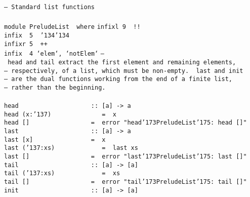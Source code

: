 \noindent\bprogB
\mbox{\tt --\ Standard\ list\ functions}\\
\mbox{\tt }\\[-8pt]
\mbox{\tt module\ PreludeList\ \ where}
%
\eprogB\noindent\bprogB
\mbox{\tt infixl\ 9\ \ !!}\\
\mbox{\tt infix\ \ 5\ \ {\char'134}{\char'134}}\\
\mbox{\tt infixr\ 5\ \ ++}\\
\mbox{\tt infix\ \ 4\ `elem`,\ `notElem`}
%
%
%
%
%
\eprogB\noindent\bprogB
\mbox{\tt --\ head\ and\ tail\ extract\ the\ first\ element\ and\ remaining\ elements,}\\
\mbox{\tt --\ respectively,\ of\ a\ list,\ which\ must\ be\ non-empty.\ \ last\ and\ init}\\
\mbox{\tt --\ are\ the\ dual\ functions\ working\ from\ the\ end\ of\ a\ finite\ list,}\\
\mbox{\tt --\ rather\ than\ the\ beginning.}\\
\mbox{\tt }\\[-8pt]
\mbox{\tt head\ \ \ \ \ \ \ \ \ \ \ \ \ \ \ \ \ \ \ \ ::\ [a]\ ->\ a}\\
\mbox{\tt head\ (x:{\char'137})\ \ \ \ \ \ \ \ \ \ \ \ \ \ =\ \ x}\\
\mbox{\tt head\ []\ \ \ \ \ \ \ \ \ \ \ \ \ \ \ \ \ =\ \ error\ "head{\char'173}PreludeList{\char'175}:\ head\ []"}
%
\eprogB\noindent\bprogB
\mbox{\tt last\ \ \ \ \ \ \ \ \ \ \ \ \ \ \ \ \ \ \ \ ::\ [a]\ ->\ a}\\
\mbox{\tt last\ [x]\ \ \ \ \ \ \ \ \ \ \ \ \ \ \ \ =\ \ x}\\
\mbox{\tt last\ ({\char'137}:xs)\ \ \ \ \ \ \ \ \ \ \ \ \ =\ \ last\ xs}\\
\mbox{\tt last\ []\ \ \ \ \ \ \ \ \ \ \ \ \ \ \ \ \ =\ \ error\ "last{\char'173}PreludeList{\char'175}:\ last\ []"}
%
\eprogB\noindent\bprogB
\mbox{\tt tail\ \ \ \ \ \ \ \ \ \ \ \ \ \ \ \ \ \ \ \ ::\ [a]\ ->\ [a]}\\
\mbox{\tt tail\ ({\char'137}:xs)\ \ \ \ \ \ \ \ \ \ \ \ \ =\ \ xs}\\
\mbox{\tt tail\ []\ \ \ \ \ \ \ \ \ \ \ \ \ \ \ \ \ =\ \ error\ "tail{\char'173}PreludeList{\char'175}:\ tail\ []"}
%
\eprogB\noindent\bprogB
\mbox{\tt init\ \ \ \ \ \ \ \ \ \ \ \ \ \ \ \ \ \ \ \ ::\ [a]\ ->\ [a]}\\
